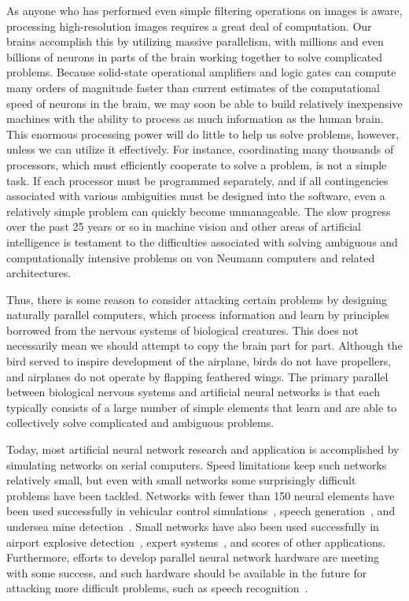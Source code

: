 \documentclass[10pt,twocolumn]{article}
\begin{document}
As anyone who has performed even simple filtering operations on images is aware,
processing high-resolution images requires a great deal of computation. Our
brains accomplish this by utilizing massive parallelism, with millions and even
billions of neurons in parts of the brain working together to solve complicated
problems. Because solid-state operational amplifiers and logic gates can compute
many orders of magnitude faster than current estimates of the computational
speed of neurons in the brain, we may soon be able to build relatively
inexpensive machines with the ability to process as much information as the
human brain. This enormous processing power will do little to help us solve
problems, however, unless we can utilize it effectively. For instance,
coordinating many thousands of processors, which must efficiently cooperate to
solve a problem, is not a simple task. If each processor must be programmed
separately, and if all contingencies associated with various ambiguities must be
designed into the software, even a relatively simple problem can quickly become
unmanageable. The slow progress over the past 25 years or so in machine vision
and other areas of artificial intelligence is testament to the difficulties
associated with solving ambiguous and computationally intensive problems on von
Neumann computers and related architectures.

Thus, there is some reason to consider attacking certain problems by designing
naturally parallel computers, which process information and learn by principles
borrowed from the nervous systems of biological creatures. This does not
necessarily mean we should attempt to copy the brain part for part. Although the
bird served to inspire development of the airplane, birds do not have
propellers, and airplanes do not operate by flapping feathered wings. The
primary parallel between biological nervous systems and artificial neural
networks is that each typically consists of a large number of simple elements
that learn and are able to collectively solve complicated and ambiguous
problems.

Today, most artificial neural network research and application is accomplished
by simulating networks on serial computers. Speed limitations keep such networks
relatively small, but even with small networks some surprisingly difficult
problems have been tackled. Networks with fewer than 150 neural elements have
been used successfully in vehicular control simulations~\cite{nguyen90},
speech generation~\cite{nettalk,nettalk2}, and undersea mine
detection~\cite{darpa}. Small networks have also been used successfully in
airport explosive detection~\cite{shea}, expert systems~\cite{bounds,bradshaw},
and scores of other applications. Furthermore, efforts to develop parallel
neural network hardware are meeting with some success, and such hardware should
be available in the future for attacking more difficult problems, such as speech
recognition~\cite{mokhoff,mead}.
\end{document}
